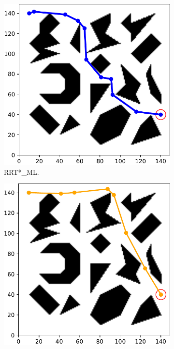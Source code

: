 \documentclass{ctuthesis}
\begin{document}
\begin{figure}[!ht]
  \centering
  \begin{subfigure}[b]{0.435\textwidth}
    \includegraphics[width=\textwidth]{figChap5/Maze_clutter_first_solution_RRTstarML.pdf}  
    \caption{RRT*\_ML.}
  \end{subfigure}  
  \begin{subfigure}[b]{0.435\textwidth}
    \includegraphics[width=\textwidth]{figChap5/Maze_clutter_first_solution_RRTstar.pdf}  

\end{subfigure}
\end{figure}
\end{document}
